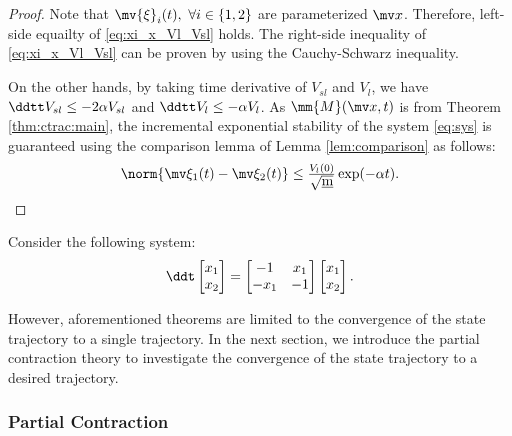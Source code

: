 \begin{proof}
    Note that $\mv{\xi}_i(t),\ \forall i\in\{1,2\}$ are parameterized $\bdx$.
    Therefore, left-side equailty of \eqref{eq:xi_x_Vl_Vsl} holds.
    The right-side inequality of \eqref{eq:xi_x_Vl_Vsl} can be proven by using the Cauchy-Schwarz inequality.

    On the other hands, by taking time derivative of $V_{sl}$ and $V_l$, we have $\ddtt V_{sl} \le -2\alpha V_{sl}$ and $\ddtt V_l \le -\alpha V_l$.
    As $\mm{M}(\bdx,t)$ is from Theorem \ref{thm:ctrac:main}, the incremental exponential stability of the system \eqref{eq:sys} is guaranteed using the comparison lemma of Lemma \ref{lem:comparison} as follows: 
    \begin{equation}
        \norm{\mv\xi_1(t)-\mv\xi_2(t)}
        \le
        \tfrac{V_{l}(0)}{\sqrt{\underbar{m}}} \exp(-\alpha t)
        .
    \end{equation}
\end{proof}


\hfill

\begin{example}
    Consider the following system:
    \begin{equation}
        \ddt
        \begin{bmatrix}
            x_1\\
            x_2
        \end{bmatrix}
        =
        \begin{bmatrix}
            -1 & x_1\\
            -x_1 & -1
        \end{bmatrix}
        \begin{bmatrix}
            x_1\\
            x_2
        \end{bmatrix}
        .
    \end{equation}
\end{example}

\hfill

However, aforementioned theorems are limited to the convergence of the state trajectory to a single trajectory.
In the next section, we introduce the partial contraction theory to investigate the convergence of the state trajectory to a desired trajectory.

\subsubsection{Partial Contraction}

